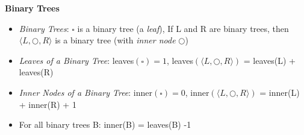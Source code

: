 \textbf{Binary Trees}
\begin{itemize}[noitemsep,topsep=0pt,leftmargin=*]
    \item \textit{Binary Trees}: $\square$ is a binary tree (a \textit{leaf}), If L and R are binary trees, then $\langle L,\bigcirc, R \rangle$ is a binary tree (with \textit{inner node} $\bigcirc$)
    \item \textit{Leaves of a Binary Tree}: leaves$(\square) = 1$, leaves$(\langle L,\bigcirc, R \rangle)$ = leaves(L) + leaves(R) 
    \item \textit{Inner Nodes of a Binary Tree}: inner$(\square) = 0$, inner$(\langle L,\bigcirc, R \rangle)$ = inner(L) + inner(R) + 1  
    \item For all binary trees B: inner(B) = leaves(B) -1 
\end{itemize} 
